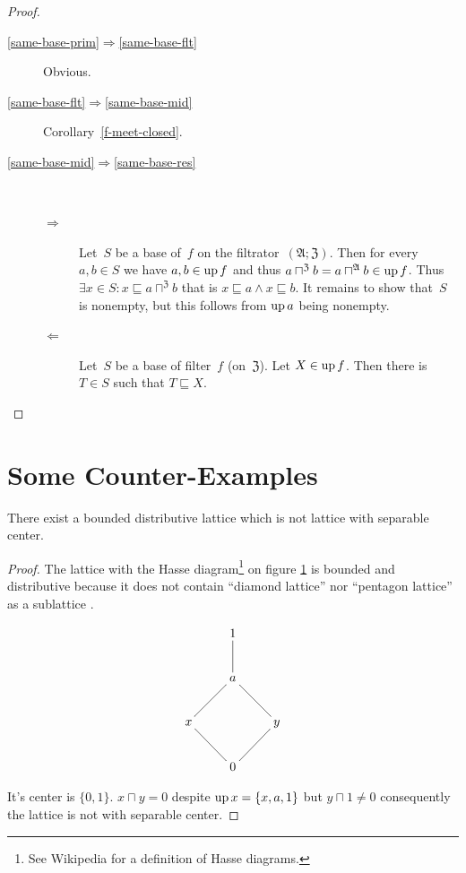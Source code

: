 \begin{proof}
~
\begin{description}
\item[\ref{same-base-prim}$\Rightarrow$\ref{same-base-flt}] Obvious.

\item[\ref{same-base-flt}$\Rightarrow$\ref{same-base-mid}] Corollary~\ref{f-meet-closed}.

\item[\ref{same-base-mid}$\Rightarrow$\ref{same-base-res}] ~
  \begin{description}
  \item[$\Rightarrow$] Let~$S$ be a base of~$f$ on the filtrator~$(\mathfrak{A};\mathfrak{Z})$.
  Then for every $a,b\in S$ we have $a,b\in\operatorname{up} f$ and thus $a\sqcap^{\mathfrak{Z}}b=a\sqcap^{\mathfrak{A}}b\in\operatorname{up} f$.
  Thus $\exists x\in S:x\sqsubseteq a\sqcap^{\mathfrak{Z}}b$ that is $x\sqsubseteq a\land x\sqsubseteq b$.
  It remains to show that~$S$ is nonempty, but this follows from $\operatorname{up} a$ being nonempty.

  \item[$\Leftarrow$] Let~$S$ be a base of filter~$f$ (on~$\mathfrak{Z}$).
  Let $X\in\operatorname{up} f$. Then there is $T\in S$ such that $T\sqsubseteq X$.
  \end{description}
\end{description}
\end{proof}

\section{Some Counter-Examples}
\begin{example}
There exist a bounded distributive lattice which is not lattice with
separable center.\end{example}
\begin{proof}
The lattice with the Hasse diagram\footnote{See Wikipedia for a definition of Hasse diagrams.}
on figure \ref{not-sep-center} is bounded and distributive because
it does not contain ``diamond lattice'' nor ``pentagon lattice''
as a sublattice \cite{wiki:distributive-lattice}.
\begin{figure}
\[
\xymatrix{ & 1\\
 & a\ar@{-}[u]\\
x\ar@{-}[ur] &  & y\ar@{-}[ul]\\
 & 0\ar@{-}[ul]\ar@{-}[ur]
}
\]
\caption{\label{not-sep-center}}
\end{figure}


It's center is $\{0,1\}$. $x\sqcap y=0$ despite $\operatorname{up} x=\{x,a,1\}$
but $y\sqcap1\ne 0$ consequently the lattice is not with separable
center.\end{proof}

